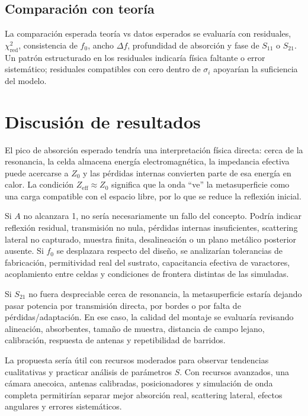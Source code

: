 \documentclass[12pt,a4paper]{article}
\begin{document}
\subsection*{Comparación con teoría}
La comparación esperada teoría vs datos esperados se evaluaría con residuales, \(\chi^2_{\mathrm{red}}\), consistencia de \(f_0\), ancho \(\Delta f\), profundidad de absorción y fase de \(S_{11}\) o \(S_{21}\). Un patrón estructurado en los residuales indicaría física faltante o error sistemático; residuales compatibles con cero dentro de \(\sigma_i\) apoyarían la suficiencia del modelo.

\section{Discusión de resultados}

El pico de absorción esperado tendría una interpretación física directa: cerca de la resonancia, la celda almacena energía electromagnética, la impedancia efectiva puede acercarse a \(Z_0\) y las pérdidas internas convierten parte de esa energía en calor. La condición \(Z_{\mathrm{eff}}\approx Z_0\) significa que la onda ``ve'' la metasuperficie como una carga compatible con el espacio libre, por lo que se reduce la reflexión inicial.

Si \(A\) no alcanzara 1, no sería necesariamente un fallo del concepto. Podría indicar reflexión residual, transmisión no nula, pérdidas internas insuficientes, scattering lateral no capturado, muestra finita, desalineación o un plano metálico posterior ausente. Si \(f_0\) se desplazara respecto del diseño, se analizarían tolerancias de fabricación, permitividad real del sustrato, capacitancia efectiva de varactores, acoplamiento entre celdas y condiciones de frontera distintas de las simuladas.

Si \(S_{21}\) no fuera despreciable cerca de resonancia, la metasuperficie estaría dejando pasar potencia por transmisión directa, por bordes o por falta de pérdidas/adaptación. En ese caso, la calidad del montaje se evaluaría revisando alineación, absorbentes, tamaño de muestra, distancia de campo lejano, calibración, respuesta de antenas y repetibilidad de barridos.

La propuesta sería útil con recursos moderados para observar tendencias cualitativas y practicar análisis de parámetros \(S\). Con recursos avanzados, una cámara anecoica, antenas calibradas, posicionadores y simulación de onda completa permitirían separar mejor absorción real, scattering lateral, efectos angulares y errores sistemáticos.
\end{document}

